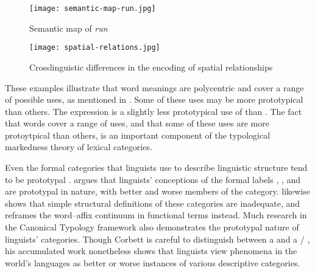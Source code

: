 \begin{landscape}
  \begin{figure}[h!]
    \texttt{[image: semantic-map-run.jpg]}
    \caption[Semantic map of English \textit{run}]{Semantic map of  \textit{run} \parencite[74]{Gries2006}}
    \label{fig:semantic-map-run}
  \end{figure}
\end{landscape}

\begin{figure}[h!]
  \texttt{[image: spatial-relations.jpg]}
  \caption[Crosslinguistic differences in the encoding of spatial relationships]{Crosslinguistic differences in the encoding of spatial relationships \parencite[485]{BowermanChoi2001}}
  \label{fig:spatial-relations}
\end{figure}

These examples illustrate that word meanings are polycentric and cover a range of possible uses, as mentioned in . Some of these uses may be more prototypical than others. The  expression  is a slightly less prototypical use of  than . The fact that words cover a range of uses, and that some of these uses are more protoytpical than others, is an important component of the typological markedness theory of lexical categories.

Even the formal categories that linguists use to describe linguistic structure tend to be prototypal \parencite[xii, 201]{Taylor2003}. \textcite[§11.1]{Taylor2003} argues that linguists' conceptions of the formal labels , , and  are prototypal in nature, with better and worse members of the category. \textcite{Haspelmath2005} likewise shows that simple structural definitions of these categories are inadequate, and reframes the word–affix continuum in functional terms instead. Much research in the Canonical Typology framework \parencite{Corbett2005} also demonstrates the prototypal nature of linguists' categories. Though Corbett is careful to distinguish between a  and a  /  \parencite[142]{Corbett2010}, his accumulated work nonetheless shows that linguists view phenomena in the world's languages as better or worse instances of various descriptive categories.

